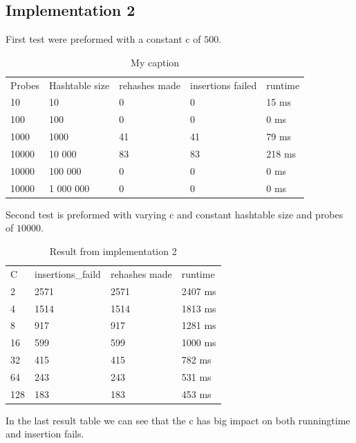 \documentclass[paper=a4, fontsize=11pt]{scrartcl}
\numberwithin{equation}{section}		%
\numberwithin{figure}{section}			%
\numberwithin{table}{section}				%
\begin{document}
\subsection{Implementation 2}
First test were preformed with a constant c of $500$.
\begin{table}[]
\centering
\caption{My caption}
\label{my-label}
\begin{tabular}{lllll}
Probes & Hashtable size & rehashes made & insertions failed & runtime \\
10     & 10             & 0             & 0                 & 15 ms   \\
100    & 100            & 0             & 0                 & 0 ms    \\
1000   & 1000           & 41            & 41                & 79 ms   \\
10000  & 10 000         & 83            & 83                & 218 ms  \\
10000  & 100 000        & 0             & 0                 & 0 ms    \\
10000  & 1 000 000      & 0             & 0                 & 0 ms  
\end{tabular}
\end{table}
 
Second test is preformed with varying c and constant hashtable size and probes of $10000$.
 
\begin{table}[]
\centering
\caption{Result from implementation 2}
\label{impl2_table}
\begin{tabular}{llll}
C   & insertions\_faild & rehashes made & runtime \\
2   & 2571              & 2571          & 2407 ms \\
4   & 1514              & 1514          & 1813 ms \\
8   & 917               & 917           & 1281 ms \\
16  & 599               & 599           & 1000 ms \\
32  & 415               & 415           & 782 ms  \\
64  & 243               & 243           & 531 ms  \\
128 & 183               & 183           & 453 ms
\end{tabular}
\end{table}
 
In the last result table we can see that the c has big impact on both runningtime and insertion fails.
\end{document}
